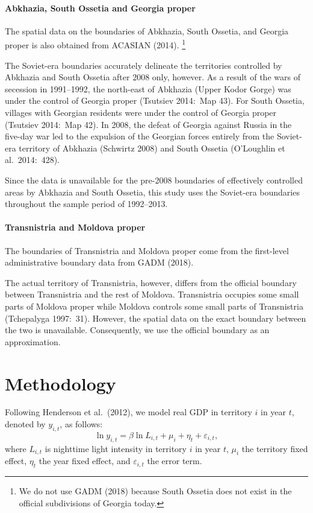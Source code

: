 \documentclass[12pt,a4paper]{article}%
\begin{document}
\paragraph{Abkhazia, South Ossetia and Georgia proper}  
The spatial data on the boundaries of Abkhazia, South Ossetia, and Georgia proper is also obtained from ACASIAN (2014).%
\footnote{
	We do not use GADM (2018) because South Ossetia does not exist in the official subdivisions of Georgia today.
	} 


The Soviet-era boundaries accurately delineate the territories controlled by Abkhazia and South Ossetia after 2008 only, however. As a result of the wars of secession in 1991--1992, the north-east of Abkhazia (Upper Kodor Gorge) was under the control of Georgia proper (Tsutsiev 2014:\ Map 43). 
For South Ossetia, villages with Georgian residents were under the control of Georgia proper (Tsutsiev 2014:\ Map 42). 
In 2008, the defeat of Georgia against Russia in the five-day war led to the expulsion of the Georgian forces entirely from the Soviet-era territory of Abkhazia (Schwirtz 2008) and South Ossetia (O'Loughlin et al.\ 2014:\ 428).  

Since the data is unavailable for the pre-2008 boundaries of effectively controlled areas by Abkhazia and South Ossetia, this study uses the Soviet-era boundaries throughout the sample period of 1992--2013.

\paragraph{Transnistria and Moldova proper} 
The boundaries of Transnistria and Moldova proper come from the first-level administrative boundary data from GADM (2018). 

The actual territory of Transnistria, however, differs from the official boundary between Transnistria and the rest of Moldova. 
Transnistria occupies some small parts of Moldova proper while Moldova controls some small parts of Transnistria (Tchepalyga 1997:\ 31). 
However, the spatial data on the exact boundary between the two is unavailable. 
Consequently, we use the official boundary as an approximation.

\section{Methodology}\label{methodology}
Following Henderson et al.\ (2012), we model real GDP in territory $i$ in year $t$, denoted by $y_{i,t}$, as follows:
\begin{equation}\label{gdp}
\ln y_{i,t} = \beta \ln L_{i,t} + \mu_i + \eta_t + \varepsilon_{i,t},
\end{equation}
where $L_{i,t}$ is nighttime light intensity in territory $i$ in year $t$, $\mu_i$ the territory fixed effect, $\eta_t$ the year fixed effect, and $\varepsilon_{i,t}$ the error term.
\end{document}
